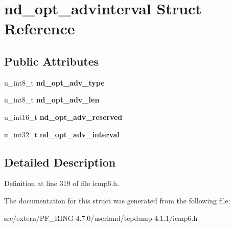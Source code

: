 \hypertarget{structnd__opt__advinterval}{
\section{nd\_\-opt\_\-advinterval Struct Reference}
\label{structnd__opt__advinterval}
}
\subsection*{Public Attributes}
\begin{DoxyCompactItemize}
\item 
\hypertarget{structnd__opt__advinterval_abca36fa503027374fdcda815fe9d6e55}{
u\_\-int8\_\-t {\bfseries nd\_\-opt\_\-adv\_\-type}}
\label{structnd__opt__advinterval_abca36fa503027374fdcda815fe9d6e55}

\item 
\hypertarget{structnd__opt__advinterval_accafa32def1a6af811e27d7868e729e3}{
u\_\-int8\_\-t {\bfseries nd\_\-opt\_\-adv\_\-len}}
\label{structnd__opt__advinterval_accafa32def1a6af811e27d7868e729e3}

\item 
\hypertarget{structnd__opt__advinterval_a37f28b5c507ec57623e0da07a6c9488b}{
u\_\-int16\_\-t {\bfseries nd\_\-opt\_\-adv\_\-reserved}}
\label{structnd__opt__advinterval_a37f28b5c507ec57623e0da07a6c9488b}

\item 
\hypertarget{structnd__opt__advinterval_a73ed3a92569ca6a8c762a5c99259ecda}{
u\_\-int32\_\-t {\bfseries nd\_\-opt\_\-adv\_\-interval}}
\label{structnd__opt__advinterval_a73ed3a92569ca6a8c762a5c99259ecda}

\end{DoxyCompactItemize}


\subsection{Detailed Description}


Definition at line 319 of file icmp6.h.



The documentation for this struct was generated from the following file:\begin{DoxyCompactItemize}
\item 
src/extern/PF\_\-RING-\/4.7.0/userland/tcpdump-\/4.1.1/icmp6.h\end{DoxyCompactItemize}

